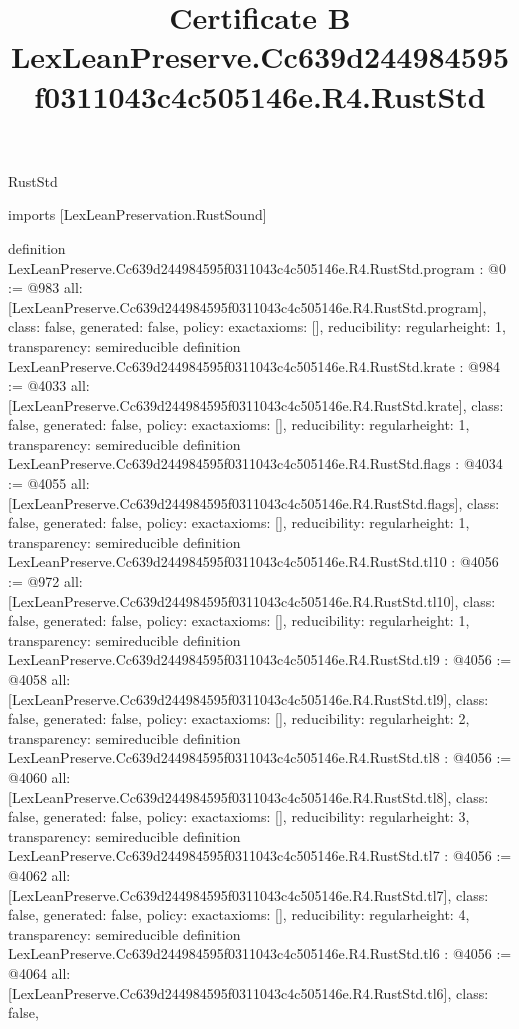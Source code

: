 \begin{lexlean}{RustStd}
\title{Certificate B LexLeanPreserve.Cc639d244984595f0311043c4c505146e.R4.RustStd}
\begin{coremodule}
imports [LexLeanPreservation.RustSound]

definition LexLeanPreserve.Cc639d244984595f0311043c4c505146e.R4.RustStd.program : @0 := @983 {
  all: [LexLeanPreserve.Cc639d244984595f0311043c4c505146e.R4.RustStd.program],
  class: false,
  generated: false,
  policy: exact{axioms: []},
  reducibility: regular{height: 1},
  transparency: semireducible
}
definition LexLeanPreserve.Cc639d244984595f0311043c4c505146e.R4.RustStd.krate : @984 := @4033 {
  all: [LexLeanPreserve.Cc639d244984595f0311043c4c505146e.R4.RustStd.krate],
  class: false,
  generated: false,
  policy: exact{axioms: []},
  reducibility: regular{height: 1},
  transparency: semireducible
}
definition LexLeanPreserve.Cc639d244984595f0311043c4c505146e.R4.RustStd.flags : @4034 := @4055 {
  all: [LexLeanPreserve.Cc639d244984595f0311043c4c505146e.R4.RustStd.flags],
  class: false,
  generated: false,
  policy: exact{axioms: []},
  reducibility: regular{height: 1},
  transparency: semireducible
}
definition LexLeanPreserve.Cc639d244984595f0311043c4c505146e.R4.RustStd.tl10 : @4056 := @972 {
  all: [LexLeanPreserve.Cc639d244984595f0311043c4c505146e.R4.RustStd.tl10],
  class: false,
  generated: false,
  policy: exact{axioms: []},
  reducibility: regular{height: 1},
  transparency: semireducible
}
definition LexLeanPreserve.Cc639d244984595f0311043c4c505146e.R4.RustStd.tl9 : @4056 := @4058 {
  all: [LexLeanPreserve.Cc639d244984595f0311043c4c505146e.R4.RustStd.tl9],
  class: false,
  generated: false,
  policy: exact{axioms: []},
  reducibility: regular{height: 2},
  transparency: semireducible
}
definition LexLeanPreserve.Cc639d244984595f0311043c4c505146e.R4.RustStd.tl8 : @4056 := @4060 {
  all: [LexLeanPreserve.Cc639d244984595f0311043c4c505146e.R4.RustStd.tl8],
  class: false,
  generated: false,
  policy: exact{axioms: []},
  reducibility: regular{height: 3},
  transparency: semireducible
}
definition LexLeanPreserve.Cc639d244984595f0311043c4c505146e.R4.RustStd.tl7 : @4056 := @4062 {
  all: [LexLeanPreserve.Cc639d244984595f0311043c4c505146e.R4.RustStd.tl7],
  class: false,
  generated: false,
  policy: exact{axioms: []},
  reducibility: regular{height: 4},
  transparency: semireducible
}
definition LexLeanPreserve.Cc639d244984595f0311043c4c505146e.R4.RustStd.tl6 : @4056 := @4064 {
  all: [LexLeanPreserve.Cc639d244984595f0311043c4c505146e.R4.RustStd.tl6],
  class: false,
}
\end{coremodule}
\end{lexlean}
